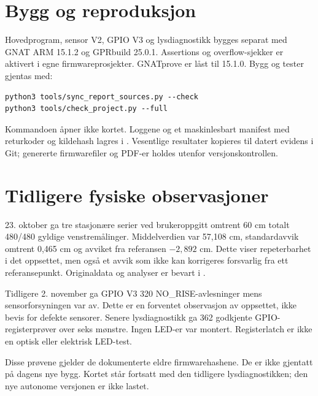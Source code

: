 \section{Bygg og reproduksjon}
Hovedprogram, sensor V2, GPIO V3 og lysdiagnostikk bygges separat med
GNAT ARM 15.1.2 og GPRbuild 25.0.1. Assertions og overflow-sjekker er
aktivert i egne firmwareprosjekter. GNATprove er låst til 15.1.0.
Bygg og tester gjentas med:
\begin{lstlisting}[language={}]
python3 tools/sync_report_sources.py --check
python3 tools/check_project.py --full
\end{lstlisting}
Kommandoen åpner ikke kortet. Loggene og et maskinlesbart manifest med
returkoder og kildehash lagres i .
Vesentlige resultater kopieres til datert evidens i Git; genererte
firmwarefiler og PDF-er holdes utenfor versjonskontrollen.

\section{Tidligere fysiske observasjoner}
23. oktober ga tre stasjonære serier ved brukeroppgitt omtrent 60 cm totalt
480/480 gyldige venstremålinger. Middelverdien var 57,108 cm,
standardavvik omtrent 0,465 cm og avviket fra referansen $-2,892$ cm.
Dette viser repeterbarhet i det oppsettet, men også et avvik som ikke
kan korrigeres forsvarlig fra ett referansepunkt. Originaldata og analyser
er bevart i .

Tidligere 2. november ga GPIO V3 320 NO\_RISE-avlesninger mens
sensorforsyningen var av. Dette er en forventet observasjon av oppsettet,
ikke bevis for defekte sensorer. Senere lysdiagnostikk ga 362 godkjente
GPIO-registerprøver over seks mønstre. Ingen LED-er var montert.
Registerlatch er ikke en optisk eller elektrisk LED-test.

Disse prøvene gjelder de dokumenterte eldre firmwarehashene. De er ikke
gjentatt på dagens nye bygg. Kortet står fortsatt med den tidligere
lysdiagnostikken; den nye autonome versjonen er ikke lastet.

